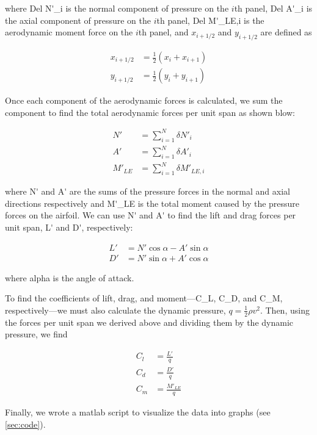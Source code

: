 \noindent where \gls{Del N'_i} is the normal component of pressure on the $i$th panel, \gls{Del A'_i} is the axial component of pressure on the $i$th panel, \gls{Del M'_LE,i} is the aerodynamic moment force on the $i$th panel, and $x_{i+1/2}$ and $y_{i+1/2}$ are defined as

\begin{align}
    x_{i+1/2}&=\frac{1}{2}\left(x_i+x_{i+1}\right) \\
    y_{i+1/2}&=\frac{1}{2}\left(y_i+y_{i+1}\right)
\end{align}

Once each component of the aerodynamic forces is calculated, we sum the component to find the total aerodynamic forces per unit span as shown blow:

\begin{align}
    N'&=\sum_{i=1}^N\delta N'_i \\
    A'&=\sum_{i=1}^N\delta A'_i \\
    M'_{LE}&=\sum_{i=1}^N\delta M'_{LE,i}
\end{align}

\noindent where \gls{N'} and \gls{A'} are the sums of the pressure forces in the normal and axial directions respectively and \gls{M'_LE} is the total moment caused by the pressure forces on the airfoil. We can use \gls{N'} and \gls{A'} to find the lift and drag forces per unit span, \gls{L'} and \gls{D'}, respectively:

\begin{align}
    L' &= N'\cos{\alpha} - A'\sin{\alpha} \\
    D' &= N'\sin{\alpha} + A'\cos{\alpha}
\end{align}

\noindent where \gls{alpha} is the angle of attack.

To find the coefficients of lift, drag, and moment—\gls{C_L}, \gls{C_D}, and \gls{C_M}, respectively—we must also calculate the dynamic pressure, $q=\frac{1}{2}\rho v^2$. Then, using the forces per unit span we derived above and dividing them by the dynamic pressure, we find

\begin{align}
    C_l &= \frac{L'}{q} \\
    C_d &= \frac{D'}{q} \\
    C_m &= \frac{M'_{LE}}{q}
\end{align}

Finally, we wrote a \acrfull{matlab} script to visualize the data into graphs (see \autoref{sec:code}).